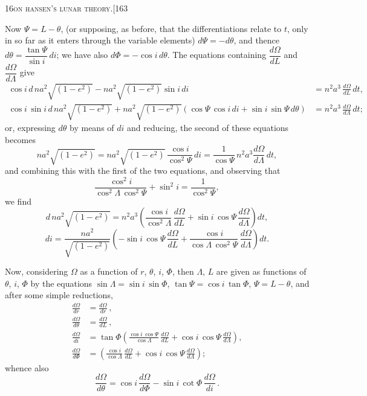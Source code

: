 \documentclass[11pt]{article}
\begin{document}
\newpage

\begin{center}
\small\textsc{16}\hfill\textsc{on hansen's lunar theory.}\hfill[163
\end{center}

\medskip

Now $\Psi = L - \theta$, (or supposing, as before, that the differentiations relate to $t$, only in
so far as it enters through the variable elements) $d\Psi = -d\theta$, and thence $d\theta = \dfrac{\tan\Psi}{\sin i}\,di$;
we have also $d\Phi = -\cos i\,d\theta$. The equations containing $\dfrac{d\Omega}{dL}$ and $\dfrac{d\Omega}{d\Lambda}$ give
\begin{align*}
\cos i\,d\,na^{2}\sqrt{(1-e^{2})} - na^{2}\sqrt{(1-e^{2})}\sin i\,di &= n^{2}a^{3}\,\frac{d\Omega}{dL}\,dt,\\
\cos i\,\sin i\,d\,na^{2}\sqrt{(1-e^{2})} + na^{2}\sqrt{(1-e^{2})}(\cos\Psi\,\cos i\,di + \sin i\,\sin\Psi\,d\theta) &= n^{2}a^{3}\,\frac{d\Omega}{d\Lambda}\,dt;
\end{align*}
or, expressing $d\theta$ by means of $di$ and reducing, the second of these equations becomes
\[
na^{2}\sqrt{(1-e^{2})} = na^{2}\sqrt{(1-e^{2})}\,\frac{\cos i}{\cos^{2}\Psi}\,di = \frac{1}{\cos\Psi}\,n^{2}a^{3}\frac{d\Omega}{d\Lambda}\,dt,
\]
and combining this with the first of the two equations, and observing that
\[
\frac{\cos^{2}i}{\cos^{2}\Lambda\,\cos^{2}\Psi} + \sin^{2}i = \frac{1}{\cos^{2}\Psi},
\]
we find
\[
d\,na^{2}\sqrt{(1-e^{2})} = n^{2}a^{3}\!\left(\frac{\cos i}{\cos^{2}\Lambda}\,\frac{d\Omega}{dL} + \sin i\,\cos\Psi\,\frac{d\Omega}{d\Lambda}\right)dt,
\]
\[
di = \frac{n a^{2}}{\sqrt{(1-e^{2})}}\!\left(-\sin i\,\cos\Psi\,\frac{d\Omega}{dL} + \frac{\cos i}{\cos\Lambda\,\cos^{2}\Psi}\,\frac{d\Omega}{d\Lambda}\right)dt.
\]

Now, considering $\Omega$ as a function of $r$, $\theta$, $i$, $\Phi$, then $\Lambda$, $L$ are given as functions of
$\theta$, $i$, $\Phi$ by the equations $\sin\Lambda = \sin i\,\sin\Phi$, $\tan\Psi = \cos i\,\tan\Phi$, $\Psi = L - \theta$, and after
some simple reductions,
\begin{align*}
\frac{d\Omega}{dr} &= \frac{d\Omega}{dr}\,,\\
\frac{d\Omega}{d\theta} &= \frac{d\Omega}{dL}\,,\\
\frac{d\Omega}{di} &= \tan\Phi\!\left(\frac{\cos i\,\cos\Psi}{\cos\Lambda}\,\frac{d\Omega}{dL} + \cos i\,\cos\Psi\,\frac{d\Omega}{d\Lambda}\right),\\
\frac{d\Omega}{d\Phi} &= \left(\frac{\cos i}{\cos\Lambda}\,\frac{d\Omega}{dL} + \cos i\,\cos\Psi\,\frac{d\Omega}{d\Lambda}\right);
\end{align*}
whence also
\[
\frac{d\Omega}{d\theta} = \cos i\,\frac{d\Omega}{d\Phi} - \sin i\,\cot\Phi\,\frac{d\Omega}{di}\,.
\]
\end{document}
